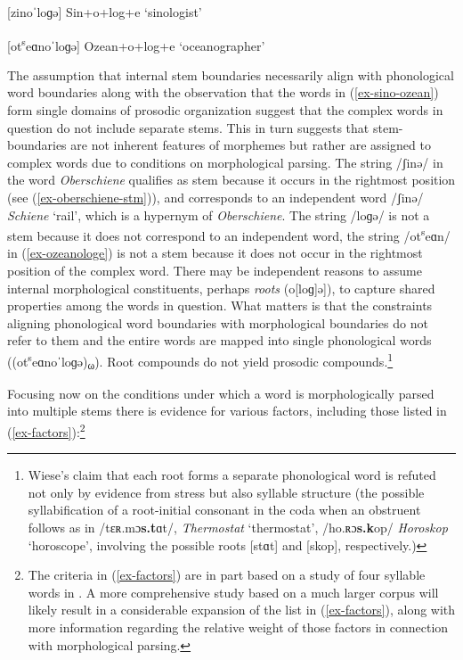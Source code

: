 \documentclass[output=paper
 ,nobabel
 ,draftmode
 ,colorlinks, citecolor=brown
]{langscibook}
\begin{document}
\eal\label{ex-sino-ozean}
\ex\label{ex-sinologe}
[zinoˈloɡə] %
Sin+o+log+e `sinologist'

\ex\label{ex-ozeanologe}
[ot\textsuperscript{s}eɑnoˈloɡə] Ozean+o+log+e `oceanographer'
\zl

\noindent
The assumption that internal stem boundaries necessarily align with phonological word boundaries
along with the observation that the words in (\ref{ex-sino-ozean}) form single domains of prosodic
organization suggest that the complex words in question do not include separate stems. This in turn
suggests that stem-boundaries are not inherent features of morphemes but rather are assigned to
complex words due to conditions on morphological parsing. The string /ʃinə/ in the word
\emph{Oberschiene} qualifies as stem because it occurs in the rightmost position (see
(\ref{ex-oberschiene-stm})), and corresponds to an independent word /ʃinə/ \emph{Schiene} `rail',
which is a hypernym of \emph{Oberschiene}. The string /loɡə/ is not a stem because it does not
correspond to an independent word, the string /ot\textsuperscript{s}eɑn/ in (\ref{ex-ozeanologe}) is
not a stem because it does not occur in the rightmost position of the complex word. There may be
independent reasons to assume internal morphological constituents, perhaps \emph{roots} (\eg
[[ot\textsuperscript{s}eɑn]o[loɡ]ə]), to capture shared properties among the words in
question. What matters is that the constraints aligning phonological word boundaries with
morphological boundaries do not refer to them and the entire words are mapped into single
phonological words (\eg (ot\textsuperscript{s}eɑnoˈloɡə)\textsubscript{ω}). Root compounds do not
yield prosodic compounds.\footnote{Wiese's claim that each root forms a separate phonological word
  \citep[298]{Wiese2000} is refuted not only by evidence from stress but also syllable structure
  (\eg the possible syllabification of a root-initial consonant in the coda when an obstruent
  follows as in /tɛʀ.mɔ\textbf{s.t}ɑt/, \emph{Thermostat} `thermostat', /ho.ʀɔ\textbf{s.k}op/
  \emph{Horoskop} `horoscope', involving the possible roots [stɑt] and [skop], respectively.)} 

\largerpage
Focusing now on the conditions under which a word is morphologically parsed into multiple stems there is evidence for various factors, including those listed in (\ref{ex-factors}):\footnote{The criteria in (\ref{ex-factors}) are in part based on a study of four syllable words in . A more comprehensive study based on a much larger corpus will likely result in a considerable expansion of the list in (\ref{ex-factors}), along with more information regarding the relative weight of those factors in connection with morphological parsing.}   
\end{document}
